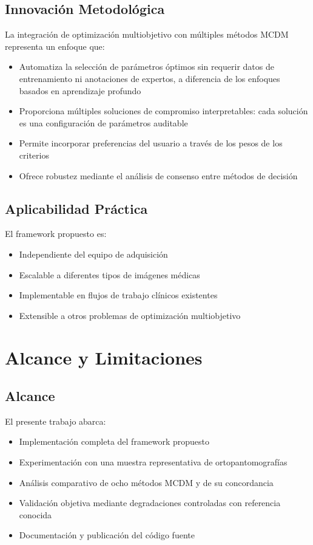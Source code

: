 \subsection{Innovación Metodológica}

La integración de optimización multiobjetivo con múltiples métodos MCDM representa un enfoque que:
\begin{itemize}
    \item Automatiza la selección de parámetros óptimos sin requerir datos de entrenamiento ni anotaciones de expertos, a diferencia de los enfoques basados en aprendizaje profundo
    \item Proporciona múltiples soluciones de compromiso interpretables: cada solución es una configuración de parámetros auditable
    \item Permite incorporar preferencias del usuario a través de los pesos de los criterios
    \item Ofrece robustez mediante el análisis de consenso entre métodos de decisión
\end{itemize}

\subsection{Aplicabilidad Práctica}

El framework propuesto es:
\begin{itemize}
    \item Independiente del equipo de adquisición
    \item Escalable a diferentes tipos de imágenes médicas
    \item Implementable en flujos de trabajo clínicos existentes
    \item Extensible a otros problemas de optimización multiobjetivo
\end{itemize}

\section{Alcance y Limitaciones}

\subsection{Alcance}

El presente trabajo abarca:
\begin{itemize}
    \item Implementación completa del framework propuesto
    \item Experimentación con una muestra representativa de ortopantomografías
    \item Análisis comparativo de ocho métodos MCDM y de su concordancia
    \item Validación objetiva mediante degradaciones controladas con referencia conocida
    \item Documentación y publicación del código fuente
\end{itemize}

